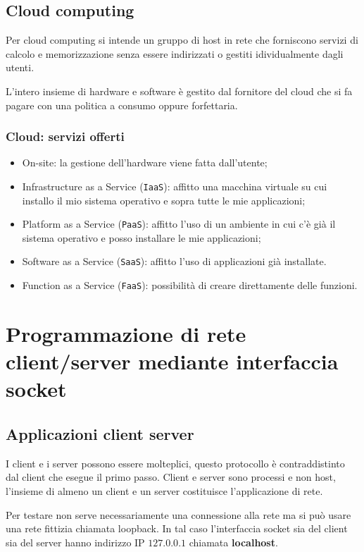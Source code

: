 \documentclass[oneside,a4paper,11pt]{book}
\theoremstyle{italicstyle}
\theoremstyle{normStyle}
\begin{document}
\section{Cloud computing}
Per cloud computing si intende un gruppo di host in rete che forniscono 
servizi di calcolo e memorizzazione senza essere indirizzati o gestiti idividualmente 
dagli utenti.

L'intero insieme di hardware e software è gestito 
dal fornitore del cloud che si fa pagare con una politica a consumo oppure forfettaria.
\subsection{Cloud: servizi offerti}
\begin{itemize}
  \item On-site: la gestione dell'hardware viene fatta dall'utente;
  \item Infrastructure as a Service (\verb|IaaS|):
  affitto una macchina virtuale su cui installo il mio sistema operativo 
  e sopra tutte le mie applicazioni;
  \item Platform as a Service (\verb|PaaS|): affitto l'uso di un ambiente in cui c'è 
  già il sistema operativo e posso installare le mie applicazioni;
  \item Software as a Service (\verb|SaaS|): affitto l'uso di applicazioni già installate.
  \item Function as a Service (\verb|FaaS|): possibilità di creare direttamente delle funzioni.
\end{itemize}

\chapter{Programmazione di rete client/server 
mediante interfaccia socket}
\section{Applicazioni client server}
I client e i server possono essere molteplici, questo protocollo 
è contraddistinto dal client che esegue il primo passo.
Client e server sono processi e non host, l'insieme 
di almeno un client e un server costituisce l'applicazione 
di rete.

Per testare non serve necessariamente una connessione alla rete ma si 
può usare una rete fittizia chiamata loopback. In tal caso l'interfaccia 
socket sia del client sia del server hanno indirizzo IP $127.0.0.1$ chiamata
\textbf{localhost}.
\end{document}
